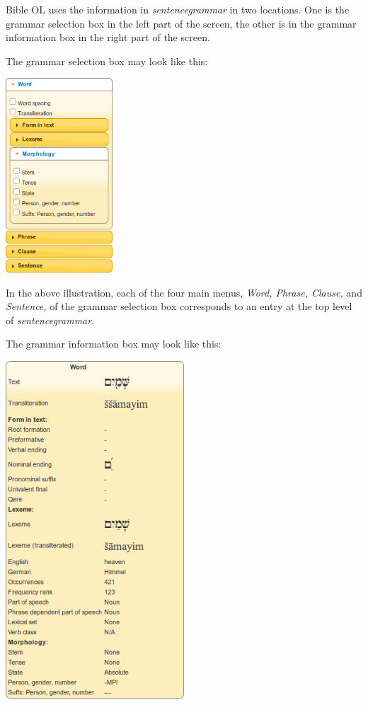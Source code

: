 \documentclass[11pt,oneside,a4paper]{memoir}
\begin{document}
Bible OL uses the information in \emph{sentencegrammar} in two locations. One is the grammar
selection box in the left part of the screen, the other is in the
grammar information box in the right part of the screen.

The grammar selection box may look like this:

\begin{center}
  \includegraphics[width=0.3\textwidth]{grammarselect.png}\label{grammarselect}
\end{center}

In the above illustration, each of the four main menus, \emph{Word, Phrase, Clause,} and
\emph{Sentence,} of the grammar selection box corresponds to an entry at the top level of
\emph{sentencegrammar}.

The grammar information box may look like this:

\begin{center}
  \includegraphics[width=0.5\textwidth]{grammarinfo.png}
\end{center}
\end{document}

